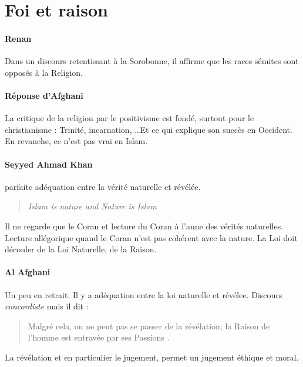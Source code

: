   
  \section{Foi et raison}
  
 \paragraph{Renan } Dans un discours retentissant à la Sorobonne, il affirme que les races sémites sont opposés à la Religion.
 
 \paragraph{Réponse d'Afghani} La critique de la religion par le positivisme est fondé, surtout pour le christianisme : Trinité, incarnation, \ldots Et ce qui explique son succès en Occident. En revanche, ce n'est pas vrai en Islam.
 
 \paragraph{Seyyed Ahmad Khan} parfaite adéquation entre la vérité naturelle et révélée. 
 \begin{quote}
    \textit{ Islam is nature and Nature is Islam}
 \end{quote}
 Il ne regarde que le Coran et lecture du Coran à l'aune des vérités naturelles. Lecture allégorique quand le Coran n'est pas cohérent avec la nature. La Loi doit découler de la Loi Naturelle, de la Raison. 
 
 \paragraph{Al Afghani} Un peu en retrait. Il y a adéquation entre la loi naturelle et révélee. Discours \textit{concordiste}  mais il dit : 
 \begin{quote}
     Malgré cela, on ne peut pas se passer de la révélation; la Raison de l'homme est entravée par ses Passions . 
 \end{quote}
  La révélation et en particulier le jugement, permet un jugement éthique et moral. 
  

